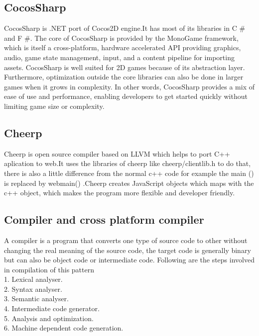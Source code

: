 \documentclass[23pt]{article}
\begin{document}
\newpage

\subsection{CocosSharp }
{\Large CocosSharp is .NET port of Cocos2D engine.It has most of its libraries in  C \# and F \#. The core of CocosSharp is provided by the MonoGame framework, which is itself a cross-platform, hardware accelerated API providing graphics, audio, game state management, input, and a content pipeline for importing assets. CocosSharp is well suited for 2D games because of its abstraction layer. Furthermore, optimization outside the core libraries can also be done in larger games when it grows in complexity. In other words, CocosSharp provides a mix of ease of use and performance, enabling developers to get started quickly without limiting game size or complexity. \par}

\subsection{Cheerp}
{\Large  Cheerp is open source compiler based on LLVM which helps to port C++ aplication to web.It uses the libraries of cheerp like cheerp/clientlib.h to do that, there is also a little difference from the normal c++ code for example the main () is replaced by webmain() .Cheerp creates JavaScript objects which maps with the c++ object, which makes the program more flexible and developer friendly. \par}

\subsection{Compiler and cross platform compiler}

{\Large A compiler is a program that converts one type of source code to other without changing the real meaning of the source code, the target code is generally binary but can also be object code or intermediate code.
Following are the steps involved in compilation of this pattern  \\
1.	Lexical analyser. \\
2.	Syntax analyser. \\
3.	Semantic analyser. \\
4.	Intermediate code generator. \\
5.	Analysis and optimization. \\
6.	Machine dependent code generation. \\
\par}
\end{document}
